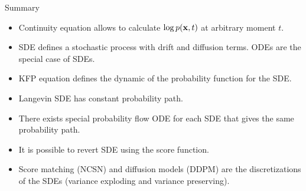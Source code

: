 \begin{frame}{Summary}
	\begin{itemize}
		\item Continuity equation allows to calculate $\log p(\mathbf{x}, t)$ at arbitrary moment $t$.
		\vfill
		\item SDE defines a stochastic process with drift and diffusion terms. ODEs are the special case of SDEs.
		\vfill
		\item KFP equation defines the dynamic of the probability function for the SDE. 
		\vfill
		\item Langevin SDE has constant probability path.
		\vfill
		\item There exists special probability flow ODE for each SDE that gives the same probability path.
		\vfill
		\item It is possible to revert SDE using the score function.
		\vfill
		\item Score matching (NCSN) and diffusion models (DDPM) are the discretizations of the SDEs (variance exploding and variance preserving).
	\end{itemize}
\end{frame}
 